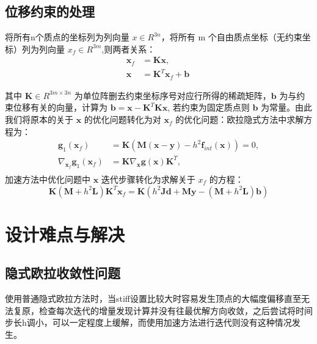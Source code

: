 \documentclass[14pt]{scrartcl} %
\begin{document}
\subsection{位移约束的处理}
将所有n个质点的坐标列为列向量 $x\in R^{3n}$，将所有 m 个自由质点坐标（无约束坐标）列为列向量 $x_f\in R^{3m}$,则两者关系：
\begin{equation}
\begin{aligned}
\boldsymbol x_f&=\boldsymbol K\boldsymbol x,\\  \boldsymbol x&=\boldsymbol K^T\boldsymbol x_f+\boldsymbol b\
\end{aligned}
\end{equation}

其中 $\boldsymbol K\in R^{3m\times 3n}$ 为单位阵删去约束坐标序号对应行所得的稀疏矩阵，$\boldsymbol b$ 为与约束位移有关的向量，计算为 $\boldsymbol b=\boldsymbol x-\boldsymbol K^T\boldsymbol K\boldsymbol x$, 若约束为固定质点则 $\boldsymbol b$ 为常量。由此我们将原本的关于 $\boldsymbol x$ 的优化问题转化为对 $\boldsymbol x_f$ 的优化问题：欧拉隐式方法中求解方程为：
\begin{equation}
\begin{aligned}
\boldsymbol g_1(\boldsymbol x_f) &= \boldsymbol K(\boldsymbol M(\boldsymbol x-\boldsymbol y) -h^2\boldsymbol f_{int}(\boldsymbol x)) = 0,\\
\nabla_{\boldsymbol x_f} \boldsymbol g_1(\boldsymbol x_f) &= \boldsymbol K\nabla_{\boldsymbol x} \boldsymbol g(\boldsymbol x)\boldsymbol K^T,\\
\end{aligned}
\end{equation}
加速方法中优化问题中 $\boldsymbol x$ 迭代步骤转化为求解关于 $x_f$ 的方程：
\begin{equation}
\boldsymbol K(\boldsymbol M+h^2\boldsymbol L)\boldsymbol K^T\boldsymbol x_f=\boldsymbol K(h^2\boldsymbol J \boldsymbol d+ \boldsymbol M \boldsymbol y-(\boldsymbol M+h^2\boldsymbol L)\boldsymbol b)
\end{equation}

\pagebreak
\section{设计难点与解决}

\subsection{隐式欧拉收敛性问题}
使用普通隐式欧拉方法时，当stiff设置比较大时容易发生顶点的大幅度偏移直至无法复原，检查每次迭代的增量发现计算并没有往最优解方向收敛，之后尝试将时间步长h调小，可以一定程度上缓解，而使用加速方法进行迭代则没有这种情况发生。
\end{document}
